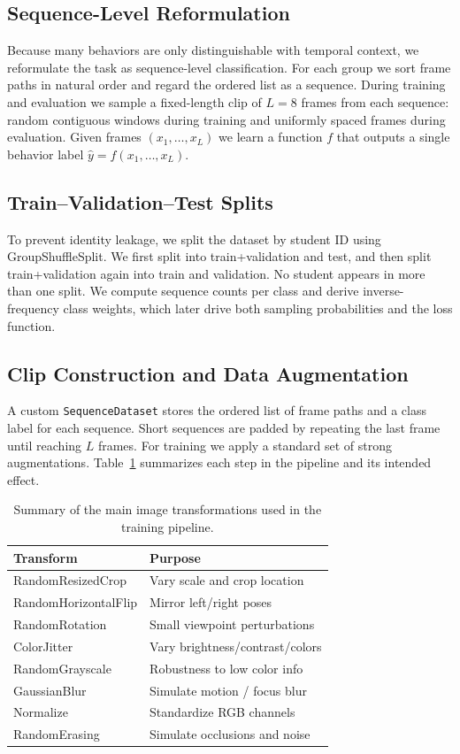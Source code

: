 \documentclass[conference]{IEEEtran}
\begin{document}
\subsection{Sequence-Level Reformulation}

Because many behaviors are only distinguishable with temporal context, we reformulate the task as sequence-level classification. For each group we sort frame paths in natural order and regard the ordered list as a sequence. During training and evaluation we sample a fixed-length clip of $L=8$ frames from each sequence: random contiguous windows during training and uniformly spaced frames during evaluation. Given frames $(x_1,\dots,x_L)$ we learn a function $f$ that outputs a single behavior label $\hat{y}=f(x_1,\dots,x_L)$.

\subsection{Train--Validation--Test Splits}

To prevent identity leakage, we split the dataset by student ID using GroupShuffleSplit. We first split into train+validation and test, and then split train+validation again into train and validation. No student appears in more than one split. We compute sequence counts per class and derive inverse-frequency class weights, which later drive both sampling probabilities and the loss function.

\subsection{Clip Construction and Data Augmentation}

A custom \texttt{SequenceDataset} stores the ordered list of frame paths and a class label for each sequence. Short sequences are padded by repeating the last frame until reaching $L$ frames. For training we apply a standard set of strong augmentations. Table~\ref{tab:augmentations} summarizes each step in the pipeline and its intended effect.

\begin{table}[t]
\centering
\caption{Summary of the main image transformations used in the training pipeline.}
\label{tab:augmentations}
\begin{tabular}{ll}
\hline
\textbf{Transform} & \textbf{Purpose} \\
\hline
RandomResizedCrop   & Vary scale and crop location \\
RandomHorizontalFlip & Mirror left/right poses \\
RandomRotation      & Small viewpoint perturbations \\
ColorJitter         & Vary brightness/contrast/colors \\
RandomGrayscale     & Robustness to low color info \\
GaussianBlur        & Simulate motion / focus blur \\
Normalize           & Standardize RGB channels \\
RandomErasing       & Simulate occlusions and noise \\
\hline
\end{tabular}
\end{table}
\end{document}
